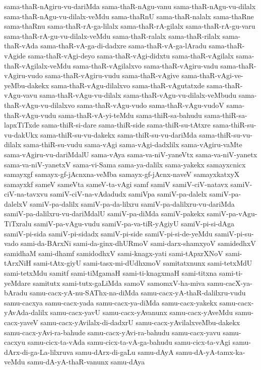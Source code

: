 {sama-thaR-nAgiru-vu-dariMda
sama-thaR-nAgu-vanu
sama-thaR-nAgu-vu-dilalx
sama-thaR-nAgu-vu-dilalx-veMdu
sama-thaRnU
sama-thaR-nalalx
sama-thaRne
sama-thaRnu
sama-thaR-rA-ga-lilalx
sama-thaR-rA-gilalx
sama-thaR-rA-gu-varu
sama-thaR-rA-gu-vu-dilalx-veMdu
sama-thaR-ralalx
sama-thaR-rilalx
sama-thaR-vAda
sama-thaR-vA-ga-di-dadxre
sama-thaR-vA-ga-lAradu
sama-thaR-vAgide
sama-thaR-vAgi-deyo
sama-thaR-vAgi-didxtu
sama-thaR-vAgilalx
sama-thaR-vAgilalx-veMdu
sama-thaR-vAgilalxvo
sama-thaR-vAgiru-vadu
sama-thaR-vAgiru-vudo
sama-thaR-vAgiru-vudu
sama-thaR-vAgive
sama-thaR-vAgi-ve-yeMbu-dakekx
sama-thaR-vAgu-dilalxvo
sama-thaR-vAgutatxde
sama-thaR-vAgu-vavu
sama-thaR-vAgu-vu-dilalx
sama-thaR-vAgu-vu-dilalx-veMbudu
sama-thaR-vAgu-vu-dilalxvo
sama-thaR-vAgu-vudo
sama-thaR-vAgu-vudoV
sama-thaR-vAgu-vudu
sama-thaR-vA-yi-teMdu
sama-thiR-sa-bahudu
sama-thiR-sa-lapxTiTxde
sama-thiR-si-dare
sama-thiR-side
sama-thiR-su-tAtxre
sama-thiR-su-vu-dakUkx
sama-thiR-su-vu-dakekx
sama-thiR-su-vu-dariMda
sama-thiR-su-vu-dilalx
sama-thiR-su-vudu
sama-vAgi
sama-vAgi-dadxlilx
sama-vAgiru-vaMte
sama-vAgiru-vu-dariMdalU
sama-vAya
sama-va-niV-yaneVtx
sama-va-niV-yanetx
sama-va-niV-yanetxV
sama-vi-Sama
sama-ya-dalilx
sama-yakekx
samayxcnicx
samayxgf
samayx-gf-jAcnxna-veMba
samayx-gf-jAcnx-naveV
samayxkatxyX
samayxkf
sameV
sameVta
sameV-ta-vAgi
samf
samiV
samiV-ciV-natavx
samiV-ciV-na-tavxvu
samiV-ciV-na-vAdadudx
samiVpa
samiV-pa-dalelx
samiV-pa-dalelxV
samiV-pa-dalilx
samiV-pa-da-lilxru
samiV-pa-dalilxru-vu-dariMda
samiV-pa-dalilxru-vu-dariMdalU
samiV-pa-diMda
samiV-pakekx
samiV-pa-vAgu-TiTxralu
samiV-pa-vAgu-vudu
samiV-pa-va-tiR-yAgiyU
samiV-pi-si-dAga
samiV-pi-sida
samiV-pi-sidadx
samiV-pi-side
samiV-pi-si-de-yeMdu
samiV-pi-su-vado
sami-da-BArxNi
sami-da-ginx-dhURmoV
sami-darx-shamxyoV
samidedhxV
samidhaM
sami-dhamf
samidodhxV
sami-knagx-yati
sami-tApxrXNoV
sami-tArxNiH
sami-tAtx-giyU
sami-tasx-mi-dUdhxmoV
samitatxnunx
sami-tetxMdU
sami-tetxMdu
samitf
sami-tiMgamaH
sami-ti-knagxmaH
sami-titxna
sami-ti-yeMdare
samitutx
sami-tutx-gaLiMda
samoV
samomxV-ha-miva
samu-cacX-ya-bAradu
samu-cacx-yA-nu-SAThx-na-diMda
samu-cacx-yA-thaR-dalilxru-vudu
samu-cacxya
samu-cacx-yada
samu-cacx-ya-diMda
samu-cacx-yakekx
samu-cacx-yAvAda-dalilx
samu-cacx-yavU
samu-cacx-yAvanunx
samu-cacx-yAveMdu
samu-cacx-yaveV
samu-cacx-yAvilalx-di-dadxrU
samu-cacx-yAvilalxveMbu-dakekx
samu-cacx-yAvi-ra-bahude
samu-cacx-yAvi-ra-bahudu
samu-cacx-yavu
samu-cacxyu
samu-cicx-ta-vAda
samu-cicx-ta-vA-ga-bahudu
samu-cicx-ta-vAgi
samu-dArx-di-ga-La-lilxruva
samu-dArx-di-gaLu
samu-dAyA
samu-dA-yA-tamx-ka-veMdu
samu-dA-yA-thaR-vanunx
samu-dAya
}

